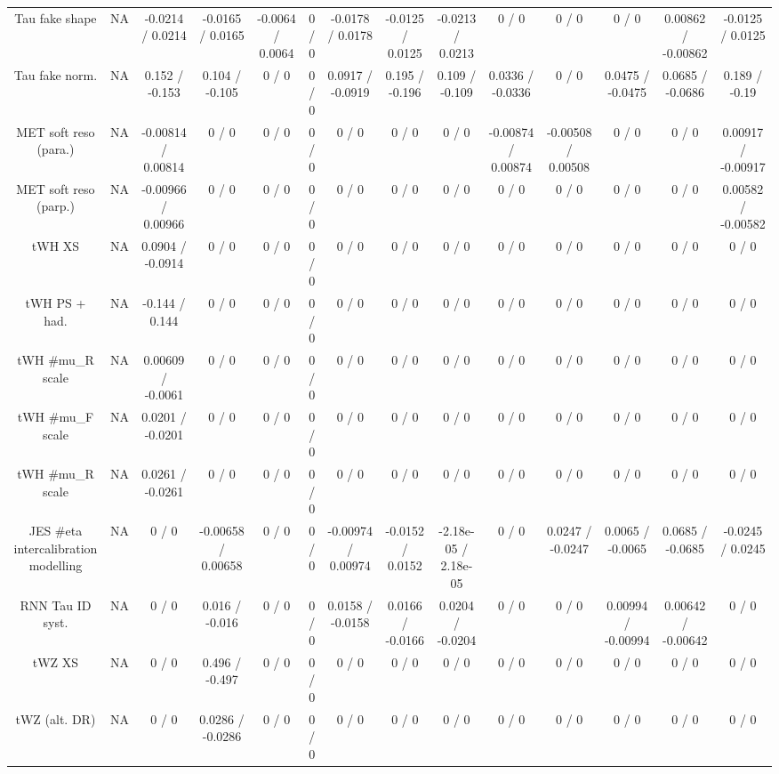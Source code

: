 \documentclass[10pt]{article}
\begin{document}
\begin{table}[htbp]
\begin{center}
\begin{tabular}{|c|c|c|c|c|c|c|c|c|c|c|c|c|c|}
  Tau fake shape &    NA    & -0.0214 / 0.0214 & -0.0165 / 0.0165 & -0.0064 / 0.0064 & 0 / 0 & -0.0178 / 0.0178 & -0.0125 / 0.0125 & -0.0213 / 0.0213 & 0 / 0 & 0 / 0 & 0 / 0 & 0.00862 / -0.00862 & -0.0125 / 0.0125 \\ 
  Tau fake norm. &    NA    & 0.152 / -0.153 & 0.104 / -0.105 & 0 / 0 & 0 / 0 & 0.0917 / -0.0919 & 0.195 / -0.196 & 0.109 / -0.109 & 0.0336 / -0.0336 & 0 / 0 & 0.0475 / -0.0475 & 0.0685 / -0.0686 & 0.189 / -0.19 \\ 
  MET soft reso (para.) &    NA    & -0.00814 / 0.00814 & 0 / 0 & 0 / 0 & 0 / 0 & 0 / 0 & 0 / 0 & 0 / 0 & -0.00874 / 0.00874 & -0.00508 / 0.00508 & 0 / 0 & 0 / 0 & 0.00917 / -0.00917 \\ 
  MET soft reso (parp.) &    NA    & -0.00966 / 0.00966 & 0 / 0 & 0 / 0 & 0 / 0 & 0 / 0 & 0 / 0 & 0 / 0 & 0 / 0 & 0 / 0 & 0 / 0 & 0 / 0 & 0.00582 / -0.00582 \\ 
  tWH XS &    NA    & 0.0904 / -0.0914 & 0 / 0 & 0 / 0 & 0 / 0 & 0 / 0 & 0 / 0 & 0 / 0 & 0 / 0 & 0 / 0 & 0 / 0 & 0 / 0 & 0 / 0 \\ 
  tWH PS + had. &    NA    & -0.144 / 0.144 & 0 / 0 & 0 / 0 & 0 / 0 & 0 / 0 & 0 / 0 & 0 / 0 & 0 / 0 & 0 / 0 & 0 / 0 & 0 / 0 & 0 / 0 \\ 
  tWH #mu_{R} scale &    NA    & 0.00609 / -0.0061 & 0 / 0 & 0 / 0 & 0 / 0 & 0 / 0 & 0 / 0 & 0 / 0 & 0 / 0 & 0 / 0 & 0 / 0 & 0 / 0 & 0 / 0 \\ 
  tWH #mu_{F} scale &    NA    & 0.0201 / -0.0201 & 0 / 0 & 0 / 0 & 0 / 0 & 0 / 0 & 0 / 0 & 0 / 0 & 0 / 0 & 0 / 0 & 0 / 0 & 0 / 0 & 0 / 0 \\ 
  tWH #mu_{R} scale &    NA    & 0.0261 / -0.0261 & 0 / 0 & 0 / 0 & 0 / 0 & 0 / 0 & 0 / 0 & 0 / 0 & 0 / 0 & 0 / 0 & 0 / 0 & 0 / 0 & 0 / 0 \\ 
  JES #eta intercalibration modelling &    NA    & 0 / 0 & -0.00658 / 0.00658 & 0 / 0 & 0 / 0 & -0.00974 / 0.00974 & -0.0152 / 0.0152 & -2.18e-05 / 2.18e-05 & 0 / 0 & 0.0247 / -0.0247 & 0.0065 / -0.0065 & 0.0685 / -0.0685 & -0.0245 / 0.0245 \\ 
  RNN Tau ID syst. &    NA    & 0 / 0 & 0.016 / -0.016 & 0 / 0 & 0 / 0 & 0.0158 / -0.0158 & 0.0166 / -0.0166 & 0.0204 / -0.0204 & 0 / 0 & 0 / 0 & 0.00994 / -0.00994 & 0.00642 / -0.00642 & 0 / 0 \\ 
  tWZ XS &    NA    & 0 / 0 & 0.496 / -0.497 & 0 / 0 & 0 / 0 & 0 / 0 & 0 / 0 & 0 / 0 & 0 / 0 & 0 / 0 & 0 / 0 & 0 / 0 & 0 / 0 \\ 
  tWZ (alt. DR) &    NA    & 0 / 0 & 0.0286 / -0.0286 & 0 / 0 & 0 / 0 & 0 / 0 & 0 / 0 & 0 / 0 & 0 / 0 & 0 / 0 & 0 / 0 & 0 / 0 & 0 / 0 \\ 

\end{tabular}
\end{center}
\end{table}
\end{document}
